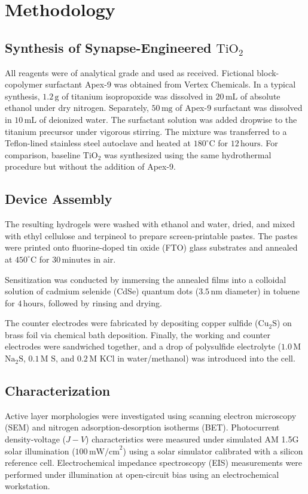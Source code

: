 \section{Methodology}
\subsection{Synthesis of Synapse-Engineered $\text{TiO}_2$}
All reagents were of analytical grade and used as received. Fictional block-copolymer surfactant Apex-9 was obtained from Vertex Chemicals. In a typical synthesis, $1.2\,\text{g}$ of titanium isopropoxide was dissolved in $20\,\text{mL}$ of absolute ethanol under dry nitrogen. Separately, $50\,\text{mg}$ of Apex-9 surfactant was dissolved in $10\,\text{mL}$ of deionized water. The surfactant solution was added dropwise to the titanium precursor under vigorous stirring. The mixture was transferred to a Teflon-lined stainless steel autoclave and heated at $180^\circ\text{C}$ for $12\,\text{hours}$. For comparison, baseline $\text{TiO}_2$ was synthesized using the same hydrothermal procedure but without the addition of Apex-9.

\subsection{Device Assembly}
The resulting hydrogels were washed with ethanol and water, dried, and mixed with ethyl cellulose and terpineol to prepare screen-printable pastes. The pastes were printed onto fluorine-doped tin oxide (FTO) glass substrates and annealed at $450^\circ\text{C}$ for $30\,\text{minutes}$ in air.

Sensitization was conducted by immersing the annealed films into a colloidal solution of cadmium selenide (CdSe) quantum dots ($3.5\,\text{nm}$ diameter) in toluene for $4\,\text{hours}$, followed by rinsing and drying. 

The counter electrodes were fabricated by depositing copper sulfide ($\text{Cu}_2\text{S}$) on brass foil via chemical bath deposition. Finally, the working and counter electrodes were sandwiched together, and a drop of polysulfide electrolyte ($1.0\,\text{M}$ $\text{Na}_2\text{S}$, $0.1\,\text{M}$ $\text{S}$, and $0.2\,\text{M}$ $\text{KCl}$ in water/methanol) was introduced into the cell.

\subsection{Characterization}
Active layer morphologies were investigated using scanning electron microscopy (SEM) and nitrogen adsorption-desorption isotherms (BET). Photocurrent density-voltage ($J-V$) characteristics were measured under simulated AM 1.5G solar illumination ($100\,\text{mW/cm}^2$) using a solar simulator calibrated with a silicon reference cell. Electrochemical impedance spectroscopy (EIS) measurements were performed under illumination at open-circuit bias using an electrochemical workstation.
